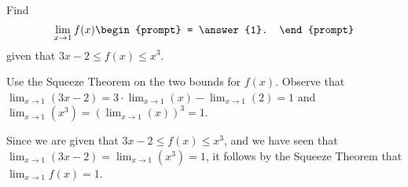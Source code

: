 \documentclass{ximera}
\author{Gregory Hartman \and Matthew Carr}
\begin{document}
\begin{exercise}



Find 
\[
\lim_{x\to1}f(x)
\begin{prompt}
= \answer{1}.
\end{prompt}
\]
given that $3x-2\le f(x)\le x^3$.
\begin{hint}
Use the Squeeze Theorem on the two bounds for $f(x)$. Observe that $\lim_{x\to1}\left({3x-2}\right)=3\cdot\lim_{x\to1}(x)-\lim_{x\to1}\left({2}\right)=1$ and $\lim_{x\to1}\left({x^3}\right)=\left({\lim_{x\to1}(x)}\right)^{3}=1$. 
\end{hint}
\begin{hint}
Since we are given that $3x-2\le f(x)\le x^3$, and we have seen that $\lim_{x\to1}\left({3x-2}\right)=\lim_{x\to1}\left({x^3}\right)=1$, it follows by the Squeeze Theorem that $\lim_{x\to1}f(x)=1$.
\end{hint}
\end{exercise}
\end{document}
